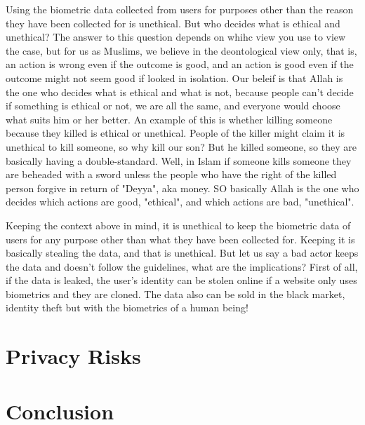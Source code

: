 \documentclass[conference]{IEEEtran}
\begin{document}
Using the biometric data collected from users for purposes other than the reason they have been collected for is unethical. But who decides what is ethical and unethical? The answer to this question depends on whihc view you use to view the case, but for us as Muslims, we believe in the deontological view only, that is, an action is wrong even if the outcome is good, and an action is good even if the outcome might not seem good if looked in isolation. Our beleif is that Allah is the one who decides what is ethical and what is not, because people can't decide if something is ethical or not, we are all the same, and everyone would choose what suits him or her better. An example of this is whether killing someone because they killed is ethical or unethical. People of the killer might claim it is unethical to kill someone, so why kill our son? But he killed someone, so they are basically having a double-standard. Well, in Islam if someone kills someone they are beheaded with a sword unless the people who have the right of the killed person forgive in return of "Deyya", aka money. SO basically Allah is the one who decides which actions are good, "ethical", and which actions are bad, "unethical".

Keeping the context above in mind, it is unethical to keep the biometric data of users for any purpose other than what they have been collected for. Keeping it is basically stealing the data, and that is unethical. But let us say a bad actor keeps the data and doesn't follow the guidelines, what are the implications? First of all, if the data is leaked, the user's identity can be stolen online if a website only uses biometrics and they are cloned. The data also can be sold in the black market, identity theft but with the biometrics of a human being!

\section{Privacy Risks}

\section{Conclusion}



\end{document}
